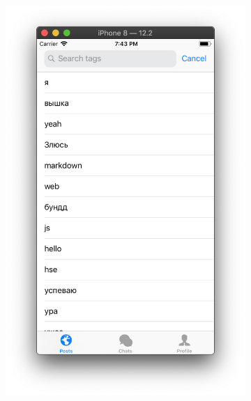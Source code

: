 \documentclass[a4paper,12pt]{article}
\begin{document}
\begin{figure}[h!]
\begin{subfigure}[b]{0.3\linewidth}
		\end{subfigure}
		\begin{subfigure}[b]{0.3\linewidth}
			\includegraphics[width=\linewidth]{../includes/pmi/search.png}
		\end{subfigure}
		\begin{subfigure}[b]{0.3\linewidth}

\end{subfigure}
\end{figure}
\end{document}
